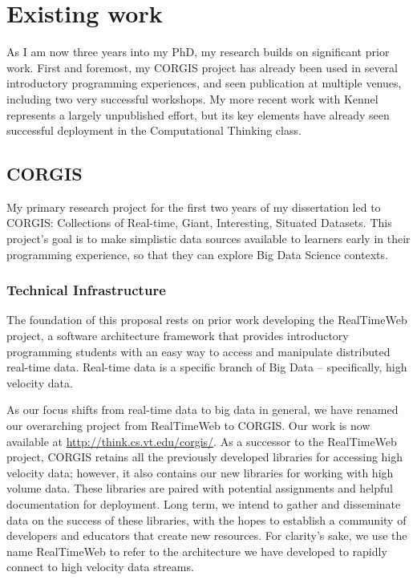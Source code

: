 \section{Existing work}

As I am now three years into my PhD, my research builds on significant prior work. First and foremost, my CORGIS project has already been used in several introductory programming experiences, and seen publication at multiple venues, including two very successful workshops.
My more recent work with Kennel represents a largely unpublished effort, but its key elements have already seen successful deployment in the Computational Thinking class.

\subsection{CORGIS}

My primary research project for the first two years of my dissertation led to CORGIS: Collections of Real-time, Giant, Interesting, Situated Datasets.
This project's goal is to make simplistic data sources available to learners early in their programming experience, so that they can explore Big Data Science contexts.

\subsubsection{Technical Infrastructure}

The foundation of this proposal rests on prior work developing the RealTimeWeb project, a software architecture framework that provides introductory programming students with an easy way to access and manipulate distributed real-time data\cite{bart-transforming}.
Real-time data is a specific branch of Big Data -- specifically, high velocity data.

As our focus shifts from real-time data to big data in general, we have renamed our overarching project from RealTimeWeb to CORGIS. Our work is now available at \url{http://think.cs.vt.edu/corgis/}. As a successor to the RealTimeWeb project, CORGIS retains all the previously developed libraries for accessing high velocity data; however, it also contains our new libraries for working with high volume data.
These libraries are paired with potential assignments and helpful documentation for deployment.
Long term, we intend to gather and disseminate data on the success of these libraries, with the hopes to establish a community of developers and educators that create new resources.
For clarity's sake, we use the name RealTimeWeb to refer to the architecture we have developed to rapidly connect to high velocity data streams.


